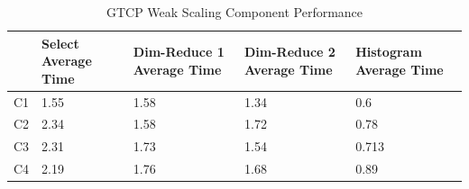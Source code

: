 \begin{table}[tbp]
\centering
\caption{GTCP Weak Scaling Component Performance}
\label{tab:eval-weak-gtcp-2}
\vspace{-0.15in}
\begin{tabular}{|p{0.1 in}|p{0.67 in}|p{0.65 in}|p{0.65 in}|p{0.65 in}|}
\hline
 & Select Average Time & Dim-Reduce 1 Average Time & Dim-Reduce 2 Average Time & Histogram Average Time\\
\hline
C1 & 1.55 & 1.58 & 1.34 & 0.6\\
\hline
C2 & 2.34 & 1.58 & 1.72 & 0.78\\
\hline
C3 & 2.31 & 1.73 & 1.54 & 0.713\\
\hline
C4 & 2.19 & 1.76 & 1.68 & 0.89\\
\hline
\end{tabular}
\vspace{-0.25in}
\end{table}

\fi
\fi
